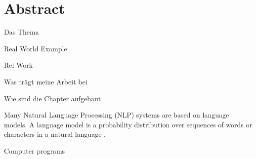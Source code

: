 \section*{Abstract}
Das Thema

Real World Example

Rel Work

Was trägt meine Arbeit bei

Wie sind die Chapter aufgebaut


Many Natural Language Processing (NLP) systems are based on language models. A language model is a probability distribution over sequences of words or characters in a natural language \cite{bengio2017deep}. 

Computer programs 


